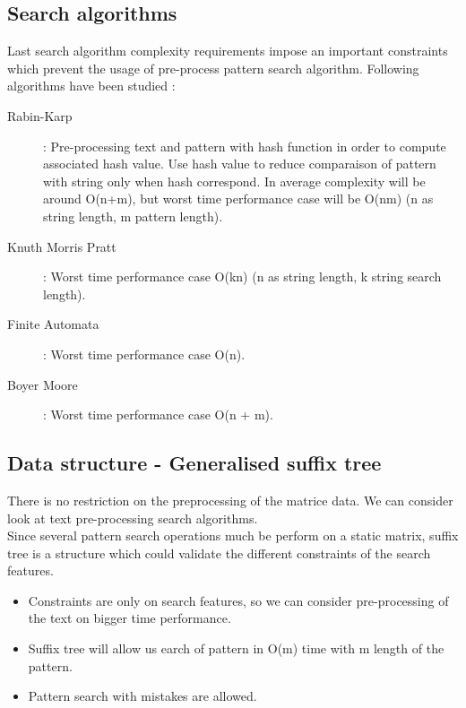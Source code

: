 \subsection{Search algorithms}

\par
Last search algorithm complexity requirements impose an important constraints which prevent the usage of pre-process pattern search algorithm. Following algorithms have been studied :
\begin{description}
	\item[Rabin-Karp] : Pre-processing text and pattern with hash function in order to compute associated hash value. Use hash value to reduce comparaison of pattern with string only when hash correspond. In average complexity will be around O(n+m), but worst time performance case will be O(nm) (n as string length, m pattern length). 
	\item[Knuth Morris Pratt] : Worst time performance case O(kn) (n as string length, k string search length).
	\item[Finite Automata] : Worst time performance case O(n).
	\item[Boyer Moore] : Worst time performance case O(n + m).
\end{description}

\subsection{Data structure - Generalised suffix tree}

\par
There is no restriction on the preprocessing of the matrice data. We can consider look at text pre-processing search algorithms.\\
Since several pattern search operations much be perform on a static matrix, suffix tree is a structure which could validate the different constraints of the search features.\\
\begin{itemize}
	\item Constraints are only on search features, so we can consider pre-processing of the text on bigger time performance.
	\item Suffix tree will allow us earch of pattern in O(m) time with m length of the pattern.
	\item Pattern search with mistakes are allowed.
\end{itemize}

